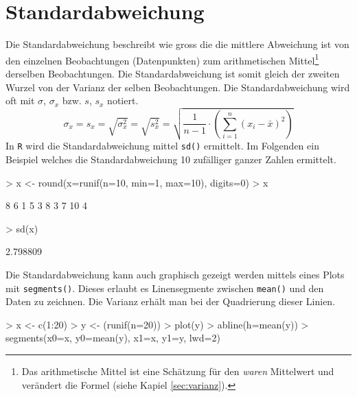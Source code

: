 \section{Standardabweichung}
Die \gls{Standardabweichung} beschreibt wie gross die die mittlere 
Abweichung ist von den einzelnen Beobachtungen (Datenpunkten) zum 
arithmetischen Mittel\footnote{Das arithmetische Mittel ist eine 
Schätzung für den
\emph{waren} Mittelwert und verändert die Formel 
(siehe Kapiel \ref{sec:varianz}).} 
derselben Beobachtungen. Die Standardabweichung ist somit gleich
der zweiten Wurzel von der Varianz der selben Beobachtungen. Die
Standardabweichung wird oft mit $\sigma$, $\sigma_x$ bzw. $s$, $s_x$ 
notiert.
\[
	\sigma_x 
	= s_x 
	= \sqrt{\sigma_{x}^2}
	= \sqrt{s_{x}^2}
	= \sqrt{\frac{1}{n-1} \cdot \left(
		\sum_{i=1}^n (x_i-\bar{x})^2 
	\right)}
\]
In \lstinline{R} wird die Standardabweichung mittel \lstinline{sd()}
ermittelt. Im Folgenden ein Beispiel welches die Standardabweichung
10 zufälliger ganzer Zahlen ermittelt.
\begin{Schunk}
\begin{Sinput}
> x <- round(x=runif(n=10, min=1, max=10), digits=0)
> x
\end{Sinput}
\begin{Soutput}
 [1]  8  6  1  5  3  8  3  7 10  4
\end{Soutput}
\begin{Sinput}
> sd(x)
\end{Sinput}
\begin{Soutput}
[1] 2.798809
\end{Soutput}
\end{Schunk}
Die Standardabweichung kann auch graphisch gezeigt werden mittels
eines Plots mit \lstinline{segments()}. Dieses erlaubt es Linensegmente
zwischen \lstinline{mean()} und den Daten zu zeichnen. Die Varianz
erhält man bei der Quadrierung dieser Linien.
\begin{Schunk}
\begin{Sinput}
> x <- c(1:20)
> y <- (runif(n=20))
> plot(y)
> abline(h=mean(y))
> segments(x0=x, y0=mean(y), x1=x, y1=y, lwd=2)
\end{Sinput}
\end{Schunk}


